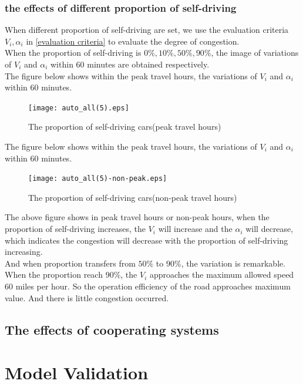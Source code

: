 \documentclass{mcmthesis}
\begin{document}
\subsubsection{the effects of different proportion of self-driving }
When different proportion of self-driving are set, we use the evaluation criteria $V_{i}, \alpha_{i}$ in \ref{evaluation criteria} to evaluate the degree of congestion. \\
\indent When the proportion of self-driving is $0\%, 10\%, 50\%, 90\%$, the image of variations of $V_{i}$ and $\alpha_{i}$ within 60 minutes are obtained respectively.\\
\indent The figure below shows within the peak travel hours, the variations of $V_{i}$ and $\alpha_{i}$ within 60 minutes.\\
\begin{figure}[H]
	\centerline{\texttt{[image: auto\_all(5).eps]}}
	\caption{The proportion of self-driving cars(peak travel hours)}	
\end{figure}
\indent The figure below shows within the peak travel hours, the variations of $V_{i}$ and $\alpha_{i}$ within 60 minutes.\\
\begin{figure}[H]
	\centerline{\texttt{[image: auto\_all(5)-non-peak.eps]}}
	\caption{The proportion of self-driving cars(non-peak travel hours)}	
\end{figure}
\indent The above figure shows in peak travel hours or non-peak hours, when the proportion of self-driving increases, the $V_{i}$ will increase and the $\alpha_{i}$ will decrease, which indicates the congestion will decrease with the proportion of self-driving increasing.\\
\indent And when proportion transfers from $50\% $ to $90\% $, the variation is remarkable. When the proportion reach $90\%$, the $V_{i}$ approaches the maximum allowed speed 60 miles per hour. So the operation efficiency of the road approaches maximum value. And there is little congestion occurred. \\

\subsection{The effects of cooperating systems}

\section{Model Validation}
\end{document}
